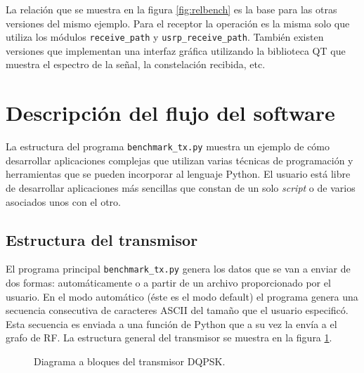 La relaci\'on que se muestra en la figura \ref{fig:relbench} es la base para las otras versiones
del mismo ejemplo. Para el receptor la operaci\'on es la misma solo que utiliza los m\'odulos
\verb|receive_path| y \verb|usrp_receive_path|. Tambi\'en existen versiones que implementan una
interfaz gr\'afica utilizando la biblioteca QT que muestra el espectro de la se\~nal, la constelaci\'on
recibida, etc.

\section{Descripci\'on del flujo del software}
La estructura del programa \verb|benchmark_tx.py| muestra un ejemplo de c\'omo desarrollar
aplicaciones complejas que utilizan varias t\'ecnicas de programaci\'on y herramientas que se pueden
incorporar al lenguaje Python. El usuario est\'a libre de desarrollar aplicaciones m\'as sencillas
que constan de un solo \emph{script} o de varios asociados unos con el otro. 

\subsection{Estructura del transmisor}
El programa principal \verb|benchmark_tx.py| genera los datos que se van a enviar de dos formas:
autom\'aticamente o a partir de un archivo proporcionado por el usuario. En el modo autom\'atico
(\'este es el modo default) el programa genera una secuencia consecutiva de caracteres ASCII del tama\~no
que el usuario especific\'o. Esta secuencia es enviada a una funci\'on de Python que a su vez la
env\'ia a el grafo de RF. La estructura general del transmisor se muestra en la figura
\ref{fig:grqpsk}.

\begin{figure}[htp]
  \centering
  \vspace{0.5in}
\vspace{0.5in}
\caption{Diagrama a bloques del transmisor DQPSK.}
\label{fig:grqpsk}
\end{figure}

